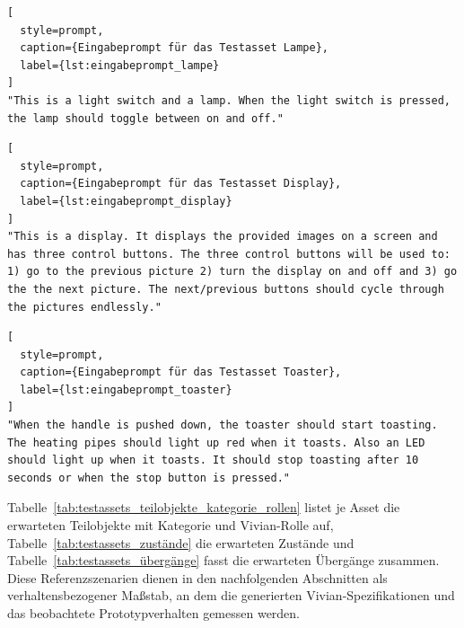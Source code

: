 \begin{lstlisting}[
  style=prompt,
  caption={Eingabeprompt für das Testasset Lampe},
  label={lst:eingabeprompt_lampe}
]
"This is a light switch and a lamp. When the light switch is pressed, the lamp should toggle between on and off."
\end{lstlisting}


\begin{lstlisting}[
  style=prompt,
  caption={Eingabeprompt für das Testasset Display},
  label={lst:eingabeprompt_display}
]
"This is a display. It displays the provided images on a screen and has three control buttons. The three control buttons will be used to: 1) go to the previous picture 2) turn the display on and off and 3) go the the next picture. The next/previous buttons should cycle through the pictures endlessly."
\end{lstlisting}


\begin{lstlisting}[
  style=prompt,
  caption={Eingabeprompt für das Testasset Toaster},
  label={lst:eingabeprompt_toaster}
]
"When the handle is pushed down, the toaster should start toasting. The heating pipes should light up red when it toasts. Also an LED should light up when it toasts. It should stop toasting after 10 seconds or when the stop button is pressed."
\end{lstlisting}

\pagebreak
Tabelle~\ref{tab:testassets_teilobjekte_kategorie_rollen} listet je Asset die erwarteten Teilobjekte mit Kategorie und Vivian-Rolle auf, Tabelle~\ref{tab:testassets_zustände} die erwarteten Zustände und Tabelle~\ref{tab:testassets_übergänge} fasst die erwarteten Übergänge zusammen. Diese Referenzszenarien dienen in den nachfolgenden Abschnitten als verhaltensbezogener Maßstab, an dem die generierten Vivian-Spezifikationen und das beobachtete Prototypverhalten gemessen werden.


